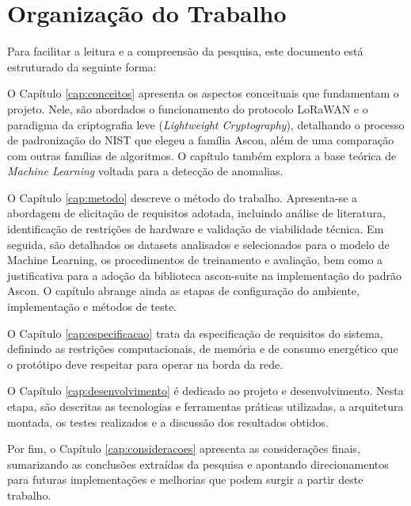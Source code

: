 
\section{Organização do Trabalho}

Para facilitar a leitura e a compreensão da pesquisa, este documento está estruturado da seguinte forma:

O Capítulo \ref{cap:conceitos} apresenta os aspectos conceituais que fundamentam o projeto. Nele, são abordados o funcionamento do protocolo LoRaWAN e o paradigma da criptografia leve (\textit{Lightweight Cryptography}), detalhando o processo de padronização do NIST que elegeu a família Ascon, além de uma comparação com outras famílias de algoritmos. O capítulo também explora a base teórica de \textit{Machine Learning} voltada para a detecção de anomalias.

O Capítulo \ref{cap:metodo} descreve o método do trabalho. Apresenta-se a
abordagem de elicitação de requisitos adotada, incluindo análise de
literatura, identificação de restrições de hardware e validação de 
viabilidade técnica. Em seguida, são detalhados os datasets analisados e 
selecionados para o modelo de Machine Learning, os procedimentos de 
treinamento e avaliação, bem como a justificativa para a adoção da 
biblioteca ascon-suite na implementação do padrão Ascon. O capítulo abrange 
ainda as etapas de configuração do ambiente, implementação e métodos de teste.

O Capítulo \ref{cap:especificacao} trata da especificação de requisitos do sistema, definindo as restrições computacionais, de memória e de consumo energético que o protótipo deve respeitar para operar na borda da rede.

O Capítulo \ref{cap:desenvolvimento} é dedicado ao projeto e desenvolvimento. Nesta etapa, são descritas as tecnologias e ferramentas práticas utilizadas, a arquitetura montada, os testes realizados e a discussão dos resultados obtidos.

Por fim, o Capítulo \ref{cap:consideracoes} apresenta as considerações finais, sumarizando as conclusões extraídas da pesquisa e apontando direcionamentos para futuras implementações e melhorias que podem surgir a partir deste trabalho.